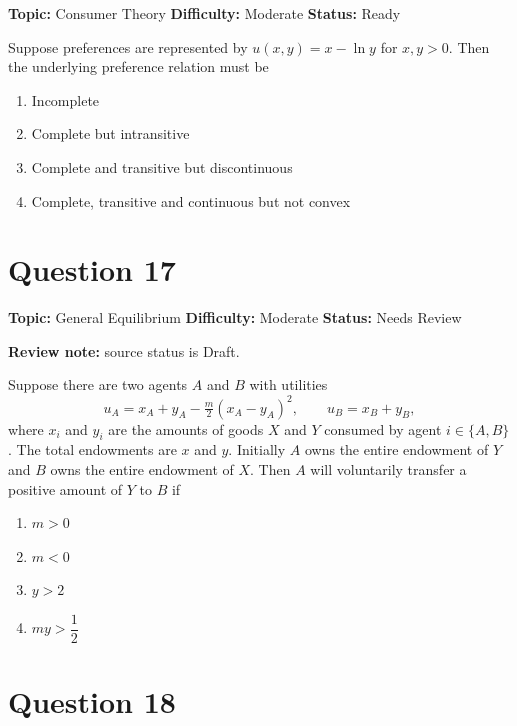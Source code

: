 \documentclass[11pt]{article}
\begin{document}

\noindent\textbf{Topic:} Consumer Theory \quad \textbf{Difficulty:} Moderate \quad \textbf{Status:} Ready



Suppose preferences are represented by $u(x,y) = x - \ln y$ for $x,y > 0$. Then the underlying preference relation must be
\begin{enumerate}[label=(\Alph*)]
\item Incomplete
\item Complete but intransitive
\item Complete and transitive but discontinuous
\item Complete, transitive and continuous but not convex
\end{enumerate}

\newpage

\section*{Question 17}


\noindent\textbf{Topic:} General Equilibrium \quad \textbf{Difficulty:} Moderate \quad \textbf{Status:} Needs Review

\par\noindent\textcolor{StatAmber}{\textbf{Review note:} source status is Draft.}


Suppose there are two agents $A$ and $B$ with utilities
\[
u_A = x_A + y_A - \tfrac{m}{2}(x_A - y_A)^2, \qquad u_B = x_B + y_B,
\]
where $x_i$ and $y_i$ are the amounts of goods $X$ and $Y$ consumed by agent
$i \in \{A,B\}$. The total endowments are $x$ and $y$. Initially $A$ owns the
entire endowment of $Y$ and $B$ owns the entire endowment of $X$. Then $A$ will
voluntarily transfer a positive amount of $Y$ to $B$ if
\begin{enumerate}[label=(\Alph*)]
\item $m > 0$ \item $m < 0$ \item $y > 2$ \item $my > \dfrac{1}{2}$
\end{enumerate}

\newpage

\section*{Question 18}
\end{document}
